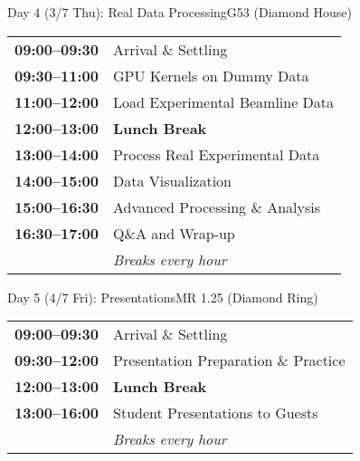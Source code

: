 \documentclass[11pt, a4paper]{article}
\begin{document}
\vspace{1em}

\begin{daycard}{Day 4 (3/7 Thu): Real Data Processing}{G53 (Diamond House)}
\begin{tabular}{@{}p{2.8cm}p{\dimexpr\linewidth-3.1cm}@{}}
\textbf{\color{textmuted}09:00--09:30} & Arrival \& Settling \\
\textbf{\color{textmuted}09:30--11:00} & GPU Kernels on Dummy Data \\
\textbf{\color{textmuted}11:00--12:00} & Load Experimental Beamline Data \\
\textbf{\color{textmuted}12:00--13:00} & \textbf{Lunch Break} \\
\textbf{\color{textmuted}13:00--14:00} & Process Real Experimental Data \\
\textbf{\color{textmuted}14:00--15:00} & Data Visualization \\
\textbf{\color{textmuted}15:00--16:30} & Advanced Processing \& Analysis \\
\textbf{\color{textmuted}16:30--17:00} & Q\&A and Wrap-up \\[0.3em]
& \textit{\color{textsecondary}Breaks every hour}
\end{tabular}
\end{daycard}

\vspace{1em}

\begin{daycard}{Day 5 (4/7 Fri): Presentations}{MR 1.25 (Diamond Ring)}
\begin{tabular}{@{}p{2.8cm}p{\dimexpr\linewidth-3.1cm}@{}}
\textbf{\color{textmuted}09:00--09:30} & Arrival \& Settling \\
\textbf{\color{textmuted}09:30--12:00} & Presentation Preparation \& Practice \\
\textbf{\color{textmuted}12:00--13:00} & \textbf{Lunch Break} \\
\textbf{\color{textmuted}13:00--16:00} & Student Presentations to Guests \\[0.3em]
& \textit{\color{textsecondary}Breaks every hour}
\end{tabular}
\end{daycard}
\end{document}
